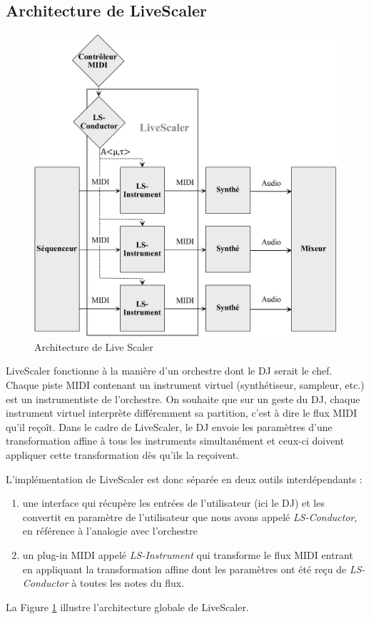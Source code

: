 \subsection{Architecture de LiveScaler}

\begin{figure}[htbp]
  \centering
  \includegraphics[width=\textwidth]{Figures/architecture-LS.pdf}
  \caption{Architecture de Live Scaler\label{Fig:archi}}
\end{figure}

LiveScaler fonctionne à la manière d'un orchestre dont le DJ serait le chef. Chaque piste MIDI contenant un instrument virtuel (synthétiseur, sampleur, etc.) est un instrumentiste de l'orchestre. On souhaite que sur un geste du DJ, chaque instrument virtuel interprète différemment sa partition, c'est à dire le flux MIDI qu'il reçoît. Dans le cadre de LiveScaler, le DJ envoie les paramètres d'une transformation affine à tous les instruments simultanément et ceux-ci doivent appliquer cette transformation dès qu'ils la reçoivent.

L'implémentation de LiveScaler est donc séparée en deux outils interdépendants : 
\begin{enumerate}
  \item une interface qui récupère les entrées de l'utilisateur (ici le DJ) et les convertit en paramètre de l'utilisateur que nous avons appelé \emph{LS-Conductor}, en référence à l'analogie avec l'orchestre
  \item un plug-in MIDI appelé \emph{LS-Instrument} qui transforme le flux MIDI entrant en appliquant la transformation affine dont les paramètres ont été reçu de \emph{LS-Conductor} à toutes les notes du flux.
\end{enumerate}
La Figure \ref{Fig:archi} illustre l'architecture globale de LiveScaler.


